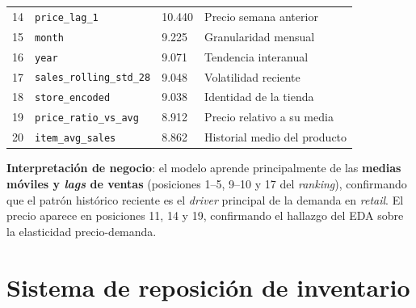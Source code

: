 \documentclass[12pt, a4paper, oneside]{report}
\newcommand{\code}[1]{\texttt{\small\color{codeblue}#1}}
\begin{document}
\begin{table}[H]
\begin{tabularx}{\textwidth}{C{1.2cm} L{4.5cm} C{2.8cm} X}
      14 & \code{price\_lag\_1}              & 10.440    & Precio semana anterior \\
       15 & \code{month}                     & 9.225     & Granularidad mensual \\
      16 & \code{year}                      & 9.071     & Tendencia interanual \\
       17 & \code{sales\_rolling\_std\_28}    & 9.048     & Volatilidad reciente \\
      18 & \code{store\_encoded}             & 9.038     & Identidad de la tienda \\
       19 & \code{price\_ratio\_vs\_avg}      & 8.912     & Precio relativo a su media \\
      20 & \code{item\_avg\_sales}           & 8.862     & Historial medio del producto \\
    \bottomrule
  \end{tabularx}
\end{table}

\textbf{Interpretaci\'on de negocio}: el modelo aprende principalmente de las \textbf{medias m\'oviles y \textit{lags} de ventas} (posiciones 1--5, 9--10 y 17 del \textit{ranking}), confirmando que el patr\'on hist\'orico reciente es el \textit{driver} principal de la demanda en \textit{retail}. El precio aparece en posiciones 11, 14 y 19, confirmando el hallazgo del EDA sobre la elasticidad precio-demanda.

\section{Sistema de reposici\'on de inventario}
\end{document}
